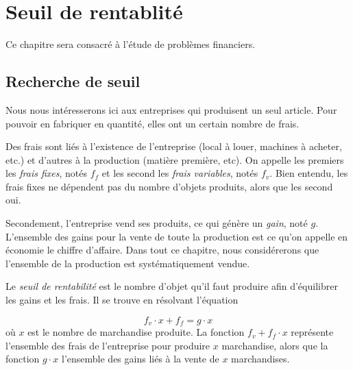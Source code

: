 \chapter{Seuil de rentablité}

Ce chapitre sera consacré à l'étude de problèmes financiers.

\section{Recherche de seuil}

Nous nous intéresserons ici aux entreprises qui produisent un seul article. Pour pouvoir en fabriquer en quantité, elles ont un certain nombre de frais.

Des frais sont liés à l'existence de l'entreprise (local à louer, machines à acheter, etc.) et d'autres à la production (matière première, etc). On appelle les premiers les \emph{frais fixes}, notés $f_f$ et les second les \emph{frais variables}, notés $f_v$. Bien entendu, les frais fixes ne dépendent pas du nombre d'objets produits, alors que les second oui.

Secondement, l'entreprise vend ses produits, ce qui génère un \emph{gain}, noté $g$. L'ensemble des gains pour la vente de toute la production est ce qu'on appelle en économie le chiffre d'affaire. Dans tout ce chapitre, nous considérerons que l'ensemble de la production est systématiquement vendue.

Le \emph{seuil de rentabilité} est le nombre d'objet qu'il faut produire afin d'équilibrer les gains et les frais. Il se trouve en résolvant l'équation

$$
f_v \cdot x + f_f = g\cdot x
$$
où $x$ est le nombre de marchandise produite. La fonction $f_v + f_f \cdot x$ représente l'ensemble des frais de l'entreprise pour produire $x$ marchandise, alors que la fonction $g\cdot x$ l'ensemble des gains liés à la vente de $x$ marchandises.

